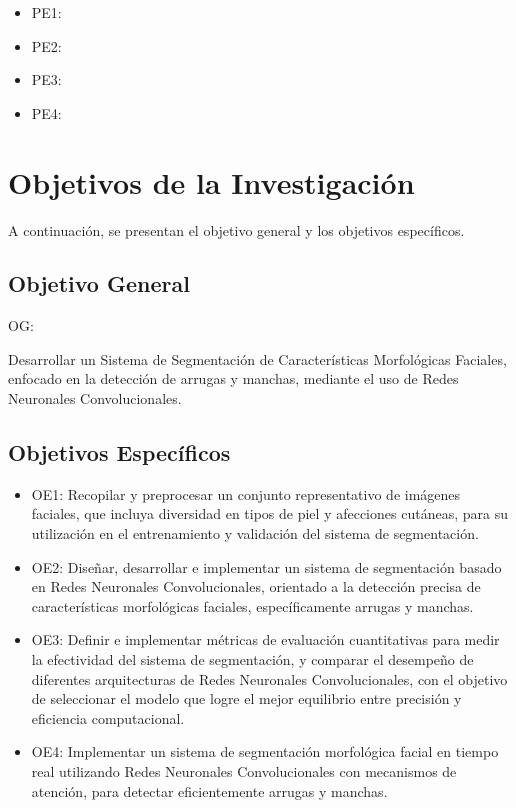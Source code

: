 \begin{itemize}
	\item PE1: {\Pbone}
	\item PE2: {\Pbtwo}
	\item PE3: {\Pbthree}
	\item PE4: {\Pbfour}
\end{itemize}

\section{Objetivos de la Investigación}
A continuación, se presentan el objetivo general y los objetivos específicos.
\subsection{Objetivo General}
OG: \newcommand{\ObjetivoGeneral}{
Desarrollar un Sistema de Segmentación de Características Morfológicas Faciales, enfocado en la detección de arrugas y manchas, mediante el uso de Redes Neuronales Convolucionales.
}
\ObjetivoGeneral
\subsection{Objetivos Específicos}
\newcommand{\Objone}{
Recopilar y preprocesar un conjunto representativo de imágenes faciales, que incluya diversidad en tipos de piel y afecciones cutáneas, para su utilización en el entrenamiento y validación del sistema de segmentación.
}

\newcommand{\Objtwo}{
Diseñar, desarrollar e implementar un sistema de segmentación basado en Redes Neuronales Convolucionales, orientado a la detección precisa de características morfológicas faciales, específicamente arrugas y manchas.
}

\newcommand{\Objthree}{
Definir e implementar métricas de evaluación cuantitativas para medir la efectividad del sistema de segmentación, y comparar el desempeño de diferentes arquitecturas de Redes Neuronales Convolucionales, con el objetivo de seleccionar el modelo que logre el mejor equilibrio entre precisión y eficiencia computacional.
}
\newcommand{\Objfour}{
Implementar un sistema de segmentación morfológica facial en tiempo real utilizando Redes Neuronales Convolucionales con mecanismos de atención, para detectar eficientemente arrugas y manchas.
}
\begin{itemize}
	\item OE1: {\Objone}
	\item OE2: {\Objtwo}
	\item OE3: {\Objthree}
	\item OE4: {\Objfour}
\end{itemize}


